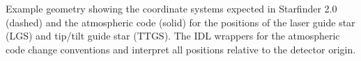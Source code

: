Example geometry showing the coordinate systems expected in Starfinder 2.0 (dashed) and the atmospheric code (solid) for the positions of the laser guide star (LGS) and tip/tilt guide star (TTGS). The IDL wrappers for the atmospheric code change conventions and interpret all positions relative to the detector origin.
\label{fig:lgs_geometry_schematic}

